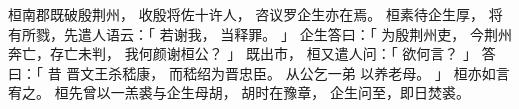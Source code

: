 
\switchcolumn*[\section{}]

桓南郡既破殷荆州，
收殷将佐十许人，
咨议罗企生亦在焉。
桓素待企生厚，
将有所戮，先遣人语云：「
    若谢我，
    当释罪。
」
企生答曰：「
    为殷荆州吏，
    今荆州奔亡，存亡未判，
    我何颜谢桓公？
」
既出市，
桓又遣人问：「
    欲何言？
」
答曰：「
    昔
    晋文王杀嵇康，
    而嵇绍为晋忠臣。
    从公乞一弟
    以养老母。
」
桓亦如言宥之。
桓先曾以一羔裘与企生母胡，
胡时在豫章，
企生问至，即日焚裘。

\switchcolumn




